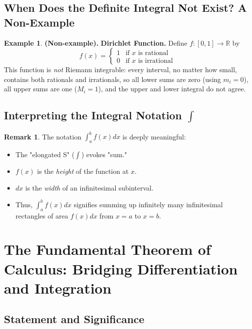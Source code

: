 \documentclass[11pt]{article}
\theoremstyle{definition}
\newtheorem{examplex}{Example}[section]
\newtheorem*{remark}{Remark}
\theoremstyle{plain}
\newenvironment{nonexample}{\begin{examplex}\textbf{(Non-example).} }{\end{examplex}}
\begin{document}
\subsection{When Does the Definite Integral Not Exist? A Non-Example}

\begin{nonexample}
\textbf{Dirichlet Function.} Define $f: [0,1] \to \mathbb{R}$ by
\[
    f(x) = \begin{cases}
        1 & \text{if } x \text{ is rational} \\
        0 & \text{if } x \text{ is irrational}
    \end{cases}
\]
This function is \emph{not} Riemann integrable: every interval, no matter how small, contains both rationals and irrationals, so all lower sums are zero (using $m_i = 0$), all upper sums are one ($M_i = 1$), and the upper and lower integral do not agree.
\end{nonexample}

\subsection{Interpreting the Integral Notation \texorpdfstring{$\int$}{int}}

\begin{remark}
The notation $\int_a^b f(x) dx$ is deeply meaningful:
\begin{itemize}
    \item The "elongated S" ($\int$) evokes "sum."
    \item $f(x)$ is the \emph{height} of the function at $x$.
    \item $dx$ is the \emph{width} of an infinitesimal subinterval.
    \item Thus, $\int_a^b f(x) dx$ signifies summing up infinitely many infinitesimal rectangles of area $f(x)dx$ from $x=a$ to $x=b$.
\end{itemize}
\end{remark}

\section{The Fundamental Theorem of Calculus: Bridging Differentiation and Integration}
 
\subsection{Statement and Significance}
\end{document}
